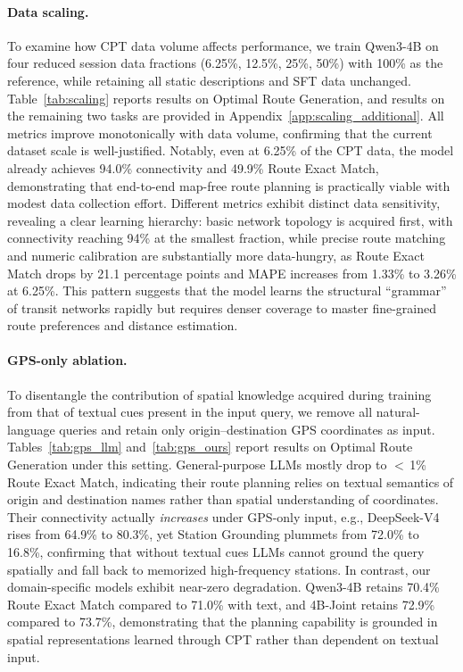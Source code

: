 \documentclass{article}
\begin{document}
\paragraph{Data scaling.}
To examine how CPT data volume affects performance, we train Qwen3-4B on four reduced session data fractions (6.25\%, 12.5\%, 25\%, 50\%) with 100\% as the reference, while retaining all static descriptions and SFT data unchanged. Table~\ref{tab:scaling} reports results on Optimal Route Generation, and results on the remaining two tasks are provided in Appendix~\ref{app:scaling_additional}. All metrics improve monotonically with data volume, confirming that the current dataset scale is well-justified. Notably, even at 6.25\% of the CPT data, the model already achieves 94.0\% connectivity and 49.9\% Route Exact Match, demonstrating that end-to-end map-free route planning is practically viable with modest data collection effort. Different metrics exhibit distinct data sensitivity, revealing a clear learning hierarchy: basic network topology is acquired first, with connectivity reaching 94\% at the smallest fraction, while precise route matching and numeric calibration are substantially more data-hungry, as Route Exact Match drops by 21.1 percentage points and MAPE increases from 1.33\% to 3.26\% at 6.25\%. This pattern suggests that the model learns the structural ``grammar'' of transit networks rapidly but requires denser coverage to master fine-grained route preferences and distance estimation.

\paragraph{GPS-only ablation.}
To disentangle the contribution of spatial knowledge acquired during training from that of textual cues present in the input query, we remove all natural-language queries and retain only origin--destination GPS coordinates as input. Tables~\ref{tab:gps_llm} and~\ref{tab:gps_ours} report results on Optimal Route Generation under this setting. General-purpose LLMs mostly drop to $<$\,1\% Route Exact Match, indicating their route planning relies on textual semantics of origin and destination names rather than spatial understanding of coordinates. Their connectivity actually \emph{increases} under GPS-only input, e.g., DeepSeek-V4 rises from 64.9\% to 80.3\%, yet Station Grounding plummets from 72.0\% to 16.8\%, confirming that without textual cues LLMs cannot ground the query spatially and fall back to memorized high-frequency stations. In contrast, our domain-specific models exhibit near-zero degradation. Qwen3-4B retains 70.4\% Route Exact Match compared to 71.0\% with text, and 4B-Joint retains 72.9\% compared to 73.7\%, demonstrating that the planning capability is grounded in spatial representations learned through CPT rather than dependent on textual input.
\end{document}

